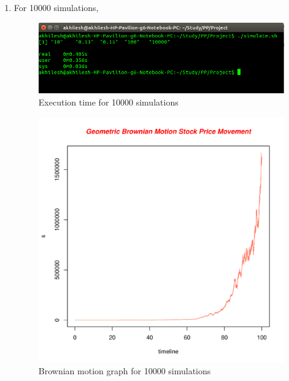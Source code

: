 \documentclass[10pt,a4paper]{article}
\begin{document}
\begin{enumerate}
\newpage
\item For 10000 simulations,\\
\begin{figure}[h]
\centering
\includegraphics[scale=0.5]{10000}
\caption{Execution time for 10000 simulations}
\end{figure}
\begin{figure}[h]
\centering
\includegraphics[scale=0.5]{10000_graph.pdf}
\caption{Brownian motion graph for 10000 simulations}
\end{figure}


\end{enumerate}
\end{document}
